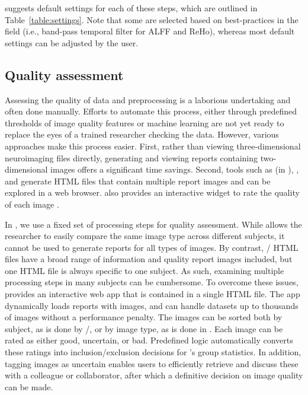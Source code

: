  suggests default settings for each of these steps, which
are outlined in Table~\ref{table:settings}. Note that some are selected based on
best-practices in the field (i.e., band-pass temporal filter for ALFF and
ReHo), whereas most default settings can be adjusted by the user.

\subsection{Quality assessment}\label{sec:qamethods}

Assessing the quality of data and preprocessing is a laborious undertaking
and often done manually. Efforts to automate this process, either through
predefined thresholds of image quality features
\citep{10.1016/j.neuroimage.2017.10.034} or machine learning
\citep{10.1371/journal.pone.0184661} are not yet ready to replace the eyes
of a trained researcher checking the data. However, various approaches make
this process easier. First, rather than viewing three-dimensional
neuroimaging files directly, generating and viewing reports containing
two-dimensional images offers a significant time savings. Second, tools
such as  (in ), , and 
generate HTML files that contain multiple report images and can be explored
in a web browser.  also provides an interactive widget to rate
the quality of each image \citep{10.1038/s41597-019-0035-4}.

In , we use a fixed set of processing steps for quality
assessment. While  allows the researcher to easily compare
the same image type across different subjects, it cannot be used to
generate reports for all types of images. By contrast,
/ HTML files have a broad range of information
and quality report images included, but one HTML file is always specific to
one subject. As such, examining multiple processing steps in many subjects
can be cumbersome. To overcome these issues,  provides an
interactive web app that is contained in a single HTML file. The app
dynamically loads reports with images, and can handle datasets up to
thousands of images without a performance penalty. The images can be sorted
both by subject, as is done by /, or by image
type, as is done in . Each image can be rated as either
good, uncertain, or bad. Predefined logic automatically converts these
ratings into inclusion/exclusion decisions for 's group
statistics. In addition, tagging images as uncertain enables users to
efficiently retrieve and discuss these with a colleague or collaborator,
after which a definitive decision on image quality can be made.

